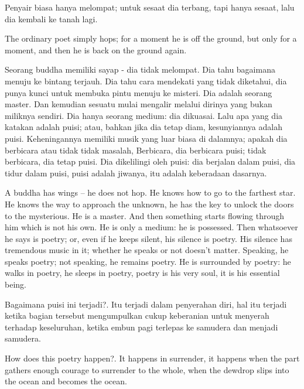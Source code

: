 \bahasa
Penyair biasa hanya melompat; untuk sesaat dia terbang, tapi hanya sesaat, lalu dia kembali ke tanah lagi.

\english
The ordinary poet simply hops; for a moment he is off the ground, but only for a moment, and then he is back on the ground again.

\bahasa
Seorang buddha memiliki sayap - dia tidak melompat. Dia tahu bagaimana menuju ke bintang terjauh. Dia tahu cara mendekati yang tidak diketahui, dia punya kunci untuk membuka pintu menuju ke misteri. Dia adalah seorang master. Dan kemudian sesuatu mulai mengalir melalui dirinya yang bukan miliknya sendiri. Dia hanya seorang medium: dia dikuasai. Lalu apa yang dia katakan adalah puisi; atau, bahkan jika dia tetap diam, kesunyiannya adalah puisi. Keheningannya memiliki musik yang luar biasa di dalamnya; apakah dia berbicara atau tidak tidak masalah, Berbicara, dia berbicara puisi; tidak berbicara, dia tetap puisi. Dia dikelilingi oleh puisi: dia berjalan dalam puisi, dia tidur dalam puisi, puisi adalah jiwanya, itu adalah keberadaan dasarnya.

\english
A buddha has wings -- he does not hop. He knows how to go to the farthest star. He knows the way to approach the unknown, he has the key to unlock the doors to the mysterious. He is a master. And then something starts flowing through him which is not his own. He is only a medium: he is possessed. Then whatsoever he says is poetry; or, even if he keeps silent, his silence is poetry. His silence has tremendous music in it; whether he speaks or not doesn't matter. Speaking, he speaks poetry; not speaking, he remains poetry. He is surrounded by poetry: he walks in poetry, he sleeps in poetry, poetry is his very soul, it is his essential being.

\bahasa
Bagaimana puisi ini terjadi?. Itu terjadi dalam penyerahan diri, hal itu terjadi ketika bagian tersebut mengumpulkan cukup keberanian untuk menyerah terhadap keseluruhan, ketika embun pagi terlepas ke samudera dan menjadi samudera.

\english
How does this poetry happen?. It happens in surrender, it happens when the part gathers enough courage to surrender to the whole, when the dewdrop slips into the ocean and becomes the ocean.


